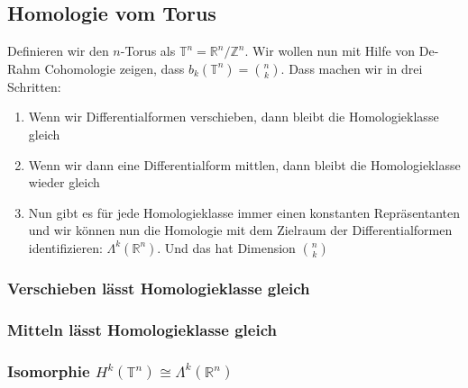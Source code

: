 \documentclass{article}
\begin{document}
	\subsection{Homologie vom Torus}

	Definieren wir den $n$-Torus als $\mathbb{T}^n = ℝ^n/ℤ^n$. Wir wollen nun mit Hilfe von De-Rahm Cohomologie zeigen, dass $b_k(\mathbb{T}^n) = \binom{n}{k}$. Dass machen wir in drei Schritten:
	\begin{enumerate}
		\item Wenn wir Differentialformen verschieben, dann bleibt die Homologieklasse gleich
		\item Wenn wir dann eine Differentialform mittlen, dann bleibt die Homologieklasse wieder gleich
		\item Nun gibt es für jede Homologieklasse immer einen konstanten Repräsentanten und wir können nun die Homologie mit dem Zielraum der Differentialformen identifizieren: $Λ^k(ℝ^n)$. Und das hat Dimension $\binom{n}{k}$
	\end{enumerate}

	\subsubsection{Verschieben lässt Homologieklasse gleich}
	\subsubsection{Mitteln lässt Homologieklasse gleich}
	\subsubsection{Isomorphie \texorpdfstring{$H^k(\mathbb{T}^n) \cong Λ^k(ℝ^n)$}{H^k(T^n) = Λ^k(ℝ^n)}}
\end{document}

